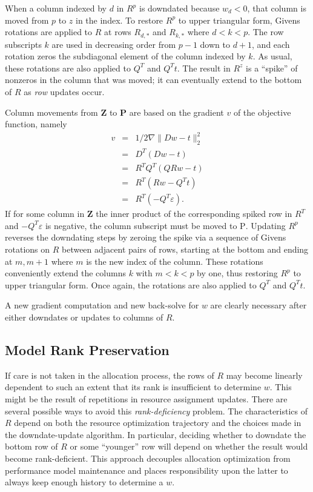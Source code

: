 When a column indexed by $d$ in $R^p$ is downdated because $w_d < 0$, that column is moved from $p$ to $z$ in the index.
To restore $R^p$ to upper triangular form, Givens rotations are applied to $R$ at rows $R_{d,*}$ and $R_{k,*}$ 
where $d < k < p$. The row subscripts $k$ are used in decreasing order from $p-1$ down to $d+1$,
and each rotation zeros the subdiagonal element of the column indexed by $k$. 
As usual, these rotations are also applied to $Q^T$ and $Q^Tt$.
The result in $R^z$ is a ``spike'' of nonzeros in the column that was moved;
it can eventually extend to the bottom of $R$ as \emph{row} updates occur.

Column movements from \textbf{Z} to \textbf{P} are based on the gradient $v$ of the objective function, namely
\begin{eqnarray*}
v &=& 1/2\nabla\|Dw - t\|^2_2 \\
  &=& D^T(Dw - t)             \\
  &=& R^TQ^T(QRw - t)         \\
  &=& R^T(Rw - Q^Tt)          \\
  &=& R^T(-Q^T\varepsilon).
\end{eqnarray*}
If for some column in \textbf{Z} the inner product of the corresponding spiked row in $R^T$ and $-Q^T\varepsilon$ is negative,
the column subscript must be moved to \textsc{P}.
Updating $R^p$ reverses the downdating steps by zeroing the spike via a sequence of Givens rotations on $R$
between adjacent pairs of rows, starting at the bottom and ending at $m,m+1$ where $m$ is the new index of the column.
These rotations conveniently extend the columns $k$ with $m < k < p$ by one,
thus restoring $R^p$ to upper triangular form. Once again, the rotations are also applied to $Q^T$ and $Q^Tt$.

A new gradient computation and new back-solve for $w$ are clearly necessary after either downdates or updates to columns of $R$.

\subsection*{Model Rank Preservation}

If care is not taken in the allocation process,
the rows of $R$ may become linearly dependent
to such an extent that its rank is insufficient to determine $w$.
This might be the result of repetitions in resource assignment updates.
There are several possible ways to avoid this \emph{rank-deficiency} problem.
The characteristics of $R$ depend on both the resource optimization trajectory and the
choices made in the downdate-update algorithm.
In particular, deciding whether to downdate the bottom row of $R$ or some ``younger'' row
will depend on whether the result would become rank-deficient.
This approach decouples allocation optimization from performance model maintenance
and places responsibility upon the latter to always keep enough history to determine a $w$.

